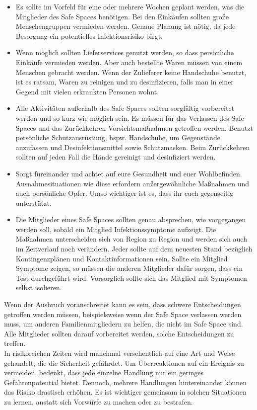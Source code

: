 \documentclass[onecolumn,journal]{IEEEtran}
\begin{document}
\begin{multicols}{2}
\begin{itemize}
\item Es sollte im Vorfeld für eine oder mehrere Wochen geplant werden, was die Mitglieder des Safe Spaces benötigen. Bei den Einkäufen sollten große Menschengruppen vermieden werden. Genaue Planung ist nötig, da jede Besorgung ein potentielles Infektionsrisiko birgt.

\item Wenn möglich sollten Lieferservices genutzt werden, so dass persönliche Einkäufe vermieden werden. Aber auch bestellte Waren müssen von einem Menschen gebracht werden. Wenn der Zulieferer keine Handschuhe benutzt, ist es ratsam, Waren zu reinigen und zu desinfizieren, falls man in einer Gegend mit vielen erkrankten Personen wohnt.

\item Alle Aktivitäten außerhalb des Safe Spaces sollten sorgfältig vorbereitet werden und so kurz wie möglich sein. Es müssen für das Verlassen des Safe Spaces und das Zurückkehren Vorsichtsmaßnahmen getroffen werden. Benutzt persönliche Schutzausrüstung, bspw. Handschuhe, um Gegenstände anzufassen und Desinfektionsmittel sowie Schutzmasken. Beim Zurückkehren sollten auf jeden Fall die Hände gereinigt und desinfiziert werden.

\item Sorgt füreinander und achtet auf eure Gesundheit und euer Wohlbefinden. Ausnahmesituationen wie diese erfordern außergewöhnliche Maßnahmen und auch persönliche Opfer. Umso wichtiger ist es, dass ihr euch gegenseitig unterstützt.

\item Die Mitglieder eines Safe Spaces sollten genau absprechen, wie vorgegangen werden soll, sobald ein Mitglied Infektionssymptome aufzeigt. Die Maßnahmen unterscheiden sich von Region zu Region und werden sich auch im Zeitverlauf noch verändern. Jeder sollte auf dem neuesten Stand bezüglich Kontingenzplänen und Kontaktinformationen sein. Sollte ein Mitglied Symptome zeigen, so müssen die anderen Mitglieder dafür sorgen, dass ein Test durchgeführt wird. Vorsorglich sollte sich das Mitglied mit Symptomen selbst isolieren.

\end{itemize}

Wenn der Ausbruch voranschreitet kann es sein, dass schwere Entscheidungen getroffen werden müssen, beispielsweise wenn der Safe Space verlassen werden muss, um anderen Familienmitgliedern zu helfen, die nicht im Safe Space sind. Alle Mitglieder sollten darauf vorbereitet werden, solche Entscheidungen zu treffen.\\

In risikoreichen Zeiten wird manchmal versehentlich auf eine Art und Weise gehandelt, die die Sicherheit gefährdet. Um Überreaktionen auf ein Ereignis zu vermeiden, bedenkt, dass jede einzelne Handlung nur ein geringes Gefahrenpotential bietet. Dennoch, mehrere Handlungen hintereinander können das Risiko drastisch erhöhen. Es ist wichtiger gemeinsam in solchen Situationen zu lernen, anstatt sich Vorwürfe zu machen oder zu bestrafen.


\end{multicols}



% 
\end{document}

